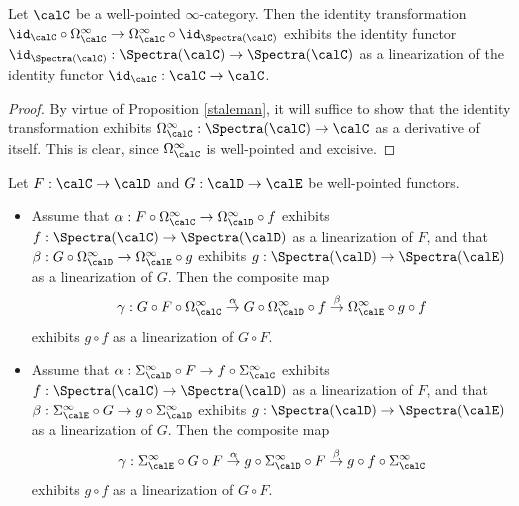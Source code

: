 \begin{corollary}
Let $\calC$ be a well-pointed $\infty$-category. Then the identity transformation
$\id_{\calC} \circ \Omega^{\infty}_{\calC} \rightarrow \Omega^{\infty}_{\calC} \circ \id_{ \Spectra(\calC)}$ exhibits the identity functor $\id_{\Spectra(\calC)}: \Spectra(\calC) \rightarrow \Spectra(\calC)$
as a linearization of the identity functor $\id_{\calC}: \calC \rightarrow \calC$.
\end{corollary}

\begin{proof}
By virtue of Proposition \ref{staleman}, it will suffice to show that
the identity transformation exhibits $\Omega^{\infty}_{\calC}: \Spectra(\calC) \rightarrow \calC$
as a derivative of itself. This is clear, since $\Omega^{\infty}_{\calC}$ is well-pointed and excisive.
\end{proof}

\begin{proposition}\label{clambake}
Let $F: \calC \rightarrow \calD$ and $G: \calD \rightarrow \calE$ be well-pointed functors.
\begin{itemize}
\item[$(1)$] Assume that $\alpha: F \circ \Omega^{\infty}_{\calC} \rightarrow \Omega^{\infty}_{\calD}
\circ f$ exhibits $f: \Spectra(\calC) \rightarrow \Spectra(\calD)$ as a linearization of
$F$, and that $\beta: G \circ \Omega^{\infty}_{\calD} \rightarrow \Omega^{\infty}_{\calE} \circ g$
exhibits $g: \Spectra(\calD) \rightarrow \Spectra(\calE)$ as a linearization of $G$.
Then the composite map
$$ \gamma: G \circ F \circ \Omega^{\infty}_{\calC} \stackrel{\alpha}{\rightarrow}
G \circ \Omega^{\infty}_{\calD} \circ f \stackrel{\beta}{\rightarrow} \Omega^{\infty}_{\calE} \circ g
\circ f$$
exhibits $g \circ f$ as a linearization of $G \circ F$.
\item[$(2)$] Assume that $\alpha: \Sigma^{\infty}_{\calD} \circ F \rightarrow f \circ \Sigma^{\infty}_{\calC}$ exhibits $f: \Spectra(\calC) \rightarrow \Spectra(\calD)$ as a linearization of
$F$, and that $\beta: \Sigma^{\infty}_{\calE} \circ G \rightarrow g \circ \Sigma^{\infty}_{\calD}$
exhibits $g: \Spectra(\calD) \rightarrow \Spectra(\calE)$ as a linearization of $G$.
Then the composite map
$$ \gamma: \Sigma^{\infty}_{\calE} \circ G \circ F \stackrel{\alpha}{\rightarrow}
g \circ \Sigma^{\infty}_{\calD} \circ F \stackrel{\beta}{\rightarrow} g
\circ f \circ \Sigma^{\infty}_{\calC}$$
exhibits $g \circ f$ as a linearization of $G \circ F$.
\end{itemize}
\end{proposition}

